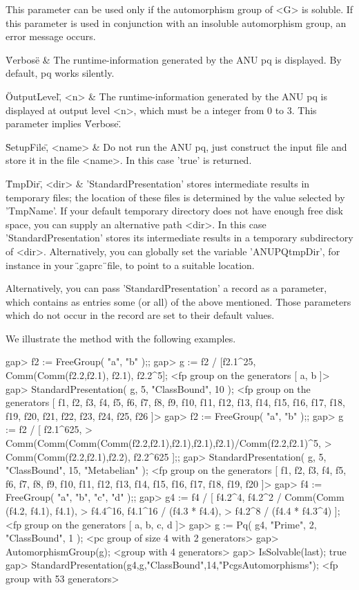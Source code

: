     This parameter can  be used only if the automorphism  group of <G> is
    soluble.  If this parameter is  used in conjunction with an insoluble
    automorphism group, an error message occurs.

\"Verbose\" &
    The  runtime-information generated by  the  ANU  pq is displayed.  By
    default, pq works silently.

\"OutputLevel\", <n> &
    The  runtime-information generated  by  the  ANU pq is  displayed  at
    output level  <n>, which  must  be  a integer  from  0  to  3.   This
    parameter implies \"Verbose\".

\"SetupFile\", <name> &
    Do not run the ANU pq, just construct the input file and  store it in
    the file <name>. In this case 'true' is returned.

\"TmpDir\", <dir> &
    'StandardPresentation'  stores  intermediate  results  in   temporary
    files;  the location  of  these  files  is  determined by  the  value
    selected by 'TmpName'.  If your default  temporary directory does not
    have enough  free  disk  space,  you  can supply an  alternative path
    <dir>.  In this case  'StandardPresentation' stores its  intermediate
    results in a temporary subdirectory of <dir>.  Alternatively, you can
    globally  set  the  variable  'ANUPQtmpDir',  for  instance  in  your
    \".gaprc\"\ file, to point to a suitable location.
\enditems

Alternatively,  you  can  pass   'StandardPresentation'  a  record  as  a
parameter,  which  contains  as  entries  some  (or  all)  of  the  above
mentioned.  Those parameters which do not occur in the record are set  to
their default values.

We illustrate the method with the following examples.

\beginexample
    gap> f2 := FreeGroup( "a", "b" );;
    gap> g := f2 / [f2.1^25, Comm(Comm(f2.2,f2.1), f2.1), f2.2^5];
    <fp group on the generators [ a, b ]>
    gap> StandardPresentation( g, 5, "ClassBound", 10 );
    <fp group on the generators [ f1, f2, f3, f4, f5, f6, f7, f8, f9, f10,
    f11, f12, f13, f14, f15, f16, f17, f18, f19, f20, f21, f22, f23, f24,
    f25, f26 ]>
    gap> f2 := FreeGroup( "a", "b" );;
    gap> g := f2 / [ f2.1^625,
    > Comm(Comm(Comm(Comm(f2.2,f2.1),f2.1),f2.1),f2.1)/Comm(f2.2,f2.1)^5,
    > Comm(Comm(f2.2,f2.1),f2.2), f2.2^625 ];;
    gap> StandardPresentation( g, 5, "ClassBound", 15, "Metabelian" );
    <fp group on the generators [ f1, f2, f3, f4, f5, f6, f7, f8, f9, f10,
    f11, f12, f13, f14, f15, f16, f17, f18, f19, f20 ]>
    gap> f4 := FreeGroup( "a", "b", "c", "d" );;
    gap> g4 := f4 / [ f4.2^4, f4.2^2 / Comm(Comm (f4.2, f4.1), f4.1),
    >                 f4.4^16, f4.1^16 / (f4.3 * f4.4),
    >                 f4.2^8 / (f4.4 * f4.3^4) ];
    <fp group on the generators [ a, b, c, d ]>
    gap> g := Pq( g4, "Prime", 2, "ClassBound", 1 );
    <pc group of size 4 with 2 generators>
    gap> AutomorphismGroup(g);
    <group with 4 generators>
    gap> IsSolvable(last); 
    true
    gap> StandardPresentation(g4,g,"ClassBound",14,"PcgsAutomorphisms");
    <fp group with 53 generators>
\endexample


